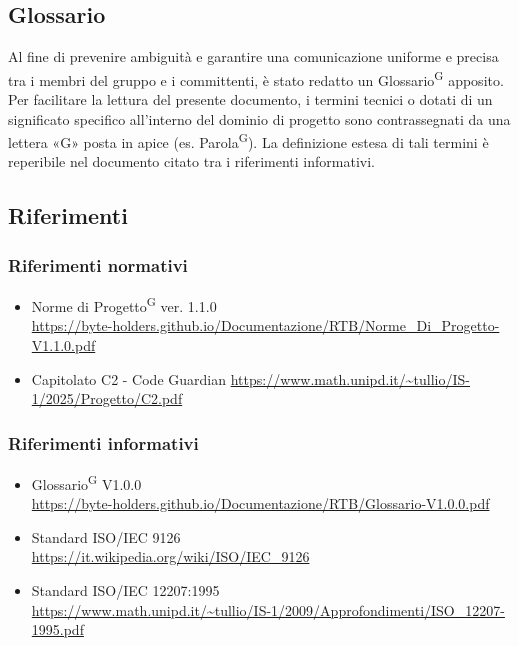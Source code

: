 \documentclass[a4paper, 11pt]{article}
\begin{document}
\subsection{Glossario}
Al fine di prevenire ambiguità e garantire una comunicazione uniforme e precisa tra i membri del gruppo e i committenti, è stato redatto un Glossario\textsuperscript{G} apposito.
Per facilitare la lettura del presente documento, i termini tecnici o dotati di un significato specifico all'interno del dominio di progetto sono contrassegnati da una lettera «G» posta in apice (es. Parola\textsuperscript{G}).
La definizione estesa di tali termini è reperibile nel documento citato tra i riferimenti informativi.

\subsection{Riferimenti}

\subsubsection{Riferimenti normativi}
\begin{itemize}
    \item
    	Norme di Progetto\textsuperscript{G} ver. 1.1.0\\
    	\url{https://byte-holders.github.io/Documentazione/RTB/Norme_Di_Progetto-V1.1.0.pdf}
    \item 
    	Capitolato C2 - Code Guardian
    	\url{https://www.math.unipd.it/~tullio/IS-1/2025/Progetto/C2.pdf}
\end{itemize}

\subsubsection{Riferimenti informativi}
\begin{itemize}
    \item 
    	Glossario\textsuperscript{G} V1.0.0\\
    	\url{https://byte-holders.github.io/Documentazione/RTB/Glossario-V1.0.0.pdf}
    \item
    	Standard ISO/IEC 9126\\
    	\url{https://it.wikipedia.org/wiki/ISO/IEC_9126}
    \item
    	Standard ISO/IEC 12207:1995\\
    	\url{https://www.math.unipd.it/~tullio/IS-1/2009/Approfondimenti/ISO_12207-1995.pdf}
\end{itemize}
\end{document}
